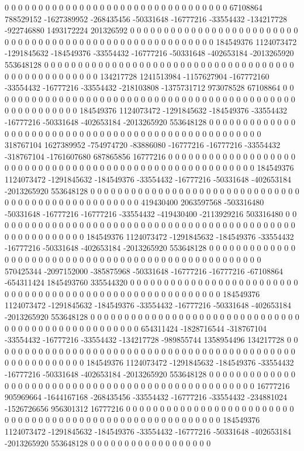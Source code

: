 0 0 0 0 0 0 0 0 0 0 0 0 0 0 0 0 0 0 0 0 0 0 0 0 0 0 0 0 0 0 0 0 0 67108864 788529152 -1627389952 -268435456 -50331648 -16777216 -33554432 -134217728 -922746880 1493172224 201326592 0 0 0 0 0 0 0 0 0 0 0 0 0 0 0 0 0 0 0 0 0 0 0 0 0 0 0 0 0 0 0 0 0 0 0 0 0 0 0 0 0 0 0 0 0 0 0 0 0 0 0 0 0 0 0 0 184549376 1124073472 -1291845632 -184549376 -33554432 -16777216 -50331648 -402653184 -2013265920 553648128 0 0 0 0 0 0 0 0 0 0 0 0 0 0 0 0 0 0
0 0 0 0 0 0 0 0 0 0 0 0 0 0 0 0 0 0 0 0 0 0 0 0 0 0 0 0 0 0 0 0 0 134217728 1241513984 -1157627904 -167772160 -33554432 -16777216 -33554432 -218103808 -1375731712 973078528 67108864 0 0 0 0 0 0 0 0 0 0 0 0 0 0 0 0 0 0 0 0 0 0 0 0 0 0 0 0 0 0 0 0 0 0 0 0 0 0 0 0 0 0 0 0 0 0 0 0 0 0 0 0 0 0 0 0 184549376 1124073472 -1291845632 -184549376 -33554432 -16777216 -50331648 -402653184 -2013265920 553648128 0 0 0 0 0 0 0 0 0 0 0 0 0 0 0 0 0 0
0 0 0 0 0 0 0 0 0 0 0 0 0 0 0 0 0 0 0 0 0 0 0 0 0 0 0 0 0 0 0 0 0 318767104 1627389952 -754974720 -83886080 -16777216 -16777216 -33554432 -318767104 -1761607680 687865856 16777216 0 0 0 0 0 0 0 0 0 0 0 0 0 0 0 0 0 0 0 0 0 0 0 0 0 0 0 0 0 0 0 0 0 0 0 0 0 0 0 0 0 0 0 0 0 0 0 0 0 0 0 0 0 0 0 0 184549376 1124073472 -1291845632 -184549376 -33554432 -16777216 -50331648 -402653184 -2013265920 553648128 0 0 0 0 0 0 0 0 0 0 0 0 0 0 0 0 0 0
0 0 0 0 0 0 0 0 0 0 0 0 0 0 0 0 0 0 0 0 0 0 0 0 0 0 0 0 0 0 0 0 0 419430400 2063597568 -503316480 -50331648 -16777216 -16777216 -33554432 -419430400 -2113929216 503316480 0 0 0 0 0 0 0 0 0 0 0 0 0 0 0 0 0 0 0 0 0 0 0 0 0 0 0 0 0 0 0 0 0 0 0 0 0 0 0 0 0 0 0 0 0 0 0 0 0 0 0 0 0 0 0 0 0 184549376 1124073472 -1291845632 -184549376 -33554432 -16777216 -50331648 -402653184 -2013265920 553648128 0 0 0 0 0 0 0 0 0 0 0 0 0 0 0 0 0 0
0 0 0 0 0 0 0 0 0 0 0 0 0 0 0 0 0 0 0 0 0 0 0 0 0 0 0 0 0 0 0 0 0 570425344 -2097152000 -385875968 -50331648 -16777216 -16777216 -67108864 -654311424 1845493760 335544320 0 0 0 0 0 0 0 0 0 0 0 0 0 0 0 0 0 0 0 0 0 0 0 0 0 0 0 0 0 0 0 0 0 0 0 0 0 0 0 0 0 0 0 0 0 0 0 0 0 0 0 0 0 0 0 0 0 184549376 1124073472 -1291845632 -184549376 -33554432 -16777216 -50331648 -402653184 -2013265920 553648128 0 0 0 0 0 0 0 0 0 0 0 0 0 0 0 0 0 0
0 0 0 0 0 0 0 0 0 0 0 0 0 0 0 0 0 0 0 0 0 0 0 0 0 0 0 0 0 0 0 0 0 654311424 -1828716544 -318767104 -33554432 -16777216 -33554432 -134217728 -989855744 1358954496 134217728 0 0 0 0 0 0 0 0 0 0 0 0 0 0 0 0 0 0 0 0 0 0 0 0 0 0 0 0 0 0 0 0 0 0 0 0 0 0 0 0 0 0 0 0 0 0 0 0 0 0 0 0 0 0 0 0 0 184549376 1124073472 -1291845632 -184549376 -33554432 -16777216 -50331648 -402653184 -2013265920 553648128 0 0 0 0 0 0 0 0 0 0 0 0 0 0 0 0 0 0
0 0 0 0 0 0 0 0 0 0 0 0 0 0 0 0 0 0 0 0 0 0 0 0 0 0 0 0 0 0 0 0 16777216 905969664 -1644167168 -268435456 -33554432 -16777216 -33554432 -234881024 -1526726656 956301312 16777216 0 0 0 0 0 0 0 0 0 0 0 0 0 0 0 0 0 0 0 0 0 0 0 0 0 0 0 0 0 0 0 0 0 0 0 0 0 0 0 0 0 0 0 0 0 0 0 0 0 0 0 0 0 0 0 0 0 184549376 1124073472 -1291845632 -184549376 -33554432 -16777216 -50331648 -402653184 -2013265920 553648128 0 0 0 0 0 0 0 0 0 0 0 0 0 0 0 0 0 0

